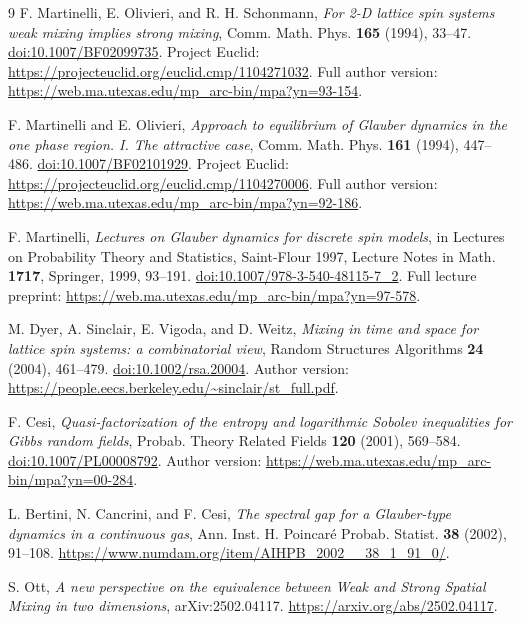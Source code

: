 \documentclass[11pt]{amsart}
\theoremstyle{definition}
\newcommand{\1}{\mathbf 1}
\begin{document}
\begin{thebibliography}{9}
F. Martinelli, E. Olivieri, and R. H. Schonmann,
\emph{For 2-D lattice spin systems weak mixing implies strong mixing},
Comm. Math. Phys. \textbf{165} (1994), 33--47.
\href{https://doi.org/10.1007/BF02099735}{doi:10.1007/BF02099735}.
Project Euclid: \url{https://projecteuclid.org/euclid.cmp/1104271032}.
Full author version: \url{https://web.ma.utexas.edu/mp_arc-bin/mpa?yn=93-154}.

F. Martinelli and E. Olivieri,
\emph{Approach to equilibrium of Glauber dynamics in the one phase region.
I. The attractive case}, Comm. Math. Phys. \textbf{161} (1994), 447--486.
\href{https://doi.org/10.1007/BF02101929}{doi:10.1007/BF02101929}.
Project Euclid: \url{https://projecteuclid.org/euclid.cmp/1104270006}.
Full author version: \url{https://web.ma.utexas.edu/mp_arc-bin/mpa?yn=92-186}.

F. Martinelli, \emph{Lectures on Glauber dynamics for discrete spin models},
in Lectures on Probability Theory and Statistics, Saint-Flour 1997,
Lecture Notes in Math. \textbf{1717}, Springer, 1999, 93--191.
\href{https://doi.org/10.1007/978-3-540-48115-7_2}{doi:10.1007/978-3-540-48115-7\_2}.
Full lecture preprint:
\url{https://web.ma.utexas.edu/mp_arc-bin/mpa?yn=97-578}.

M. Dyer, A. Sinclair, E. Vigoda, and D. Weitz,
\emph{Mixing in time and space for lattice spin systems: a combinatorial
view}, Random Structures Algorithms \textbf{24} (2004), 461--479.
\href{https://doi.org/10.1002/rsa.20004}{doi:10.1002/rsa.20004}.
Author version: \url{https://people.eecs.berkeley.edu/~sinclair/st_full.pdf}.

F. Cesi, \emph{Quasi-factorization of the entropy and logarithmic Sobolev
inequalities for Gibbs random fields}, Probab. Theory Related Fields
\textbf{120} (2001), 569--584.
\href{https://doi.org/10.1007/PL00008792}{doi:10.1007/PL00008792}.
Author version: \url{https://web.ma.utexas.edu/mp_arc-bin/mpa?yn=00-284}.

L. Bertini, N. Cancrini, and F. Cesi,
\emph{The spectral gap for a Glauber-type dynamics in a continuous gas},
Ann. Inst. H. Poincar\'e Probab. Statist. \textbf{38} (2002), 91--108.
\url{https://www.numdam.org/item/AIHPB_2002__38_1_91_0/}.

S. Ott, \emph{A new perspective on the equivalence between Weak and Strong
Spatial Mixing in two dimensions}, arXiv:2502.04117.
\url{https://arxiv.org/abs/2502.04117}.
\end{thebibliography}
\end{document}
